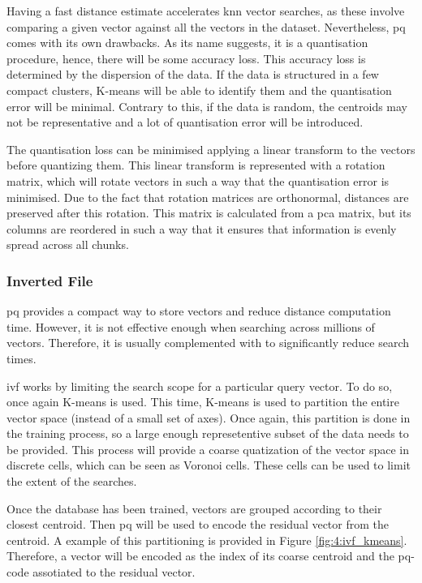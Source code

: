 \documentclass[../main.tex]{subfiles}
\begin{document}
Having a fast distance estimate accelerates \gls{knn} vector searches, as these involve comparing a given vector against all the vectors in the dataset. Nevertheless, \gls{pq} comes with its own drawbacks. As its name suggests, it is a quantisation procedure, hence, there will be some accuracy loss. This accuracy loss is determined by the dispersion of the data. If the data is structured in a few compact clusters, K-means will be able to identify them and the quantisation error will be minimal. Contrary to this, if the data is random, the centroids may not be representative and a lot of quantisation error will be introduced.

The quantisation loss can be minimised applying a linear transform to the vectors before quantizing them. This linear transform is represented with a rotation matrix, which will rotate vectors in such a way that the quantisation error is minimised. Due to the fact that rotation matrices are orthonormal, distances are preserved after this rotation\cite{ge2013}. This matrix is calculated from a \gls{pca} matrix, but its columns are reordered in such a way that it ensures that information is evenly spread across all chunks. 

\subsubsection{Inverted File}
\Gls{pq} provides a compact way to store vectors and reduce distance computation time. However, it is not effective enough when searching across millions of vectors\cite{chang2022b}. Therefore, it is usually complemented with  to significantly reduce search times.

\Gls{ivf} works by limiting the search scope for a particular query vector. To do so, once again K-means is used. This time, K-means is used to partition the entire vector space (instead of a small set of axes). Once again, this partition is done in the training process, so a large enough represetentive subset of the data needs to be provided. This process will provide a coarse quatization of the vector space in discrete cells, which can be seen as Voronoi cells\cite{chang2022b}. These cells can be used to limit the extent of the searches.

Once the database has been trained, vectors are grouped according to their closest centroid. Then \gls{pq} will be used to encode the residual vector from the centroid. A example of this partitioning is provided in Figure \ref{fig:4:ivf_kmeans}. Therefore, a vector will be encoded as the index of its coarse centroid and the \gls{pq}-code assotiated to the residual vector\cite{chang2022b}.
\end{document}
